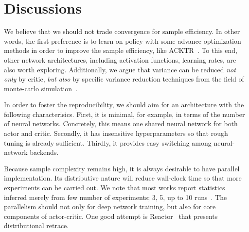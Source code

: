 \section{Discussions}






We believe that we should not trade convergence for sample efficiency.
In other words, the first preference is to learn on-policy with some advance optimization methods
in order to improve the sample efficiency, like ACKTR~\cite{NIPS2017_7112}.
To this end, other network architectures, including activation functions, learning rates, are also worth exploring.
Additionally, we argue that variance can be reduced \emph{not only} by critic,
\emph{but also} by specific variance reduction techniques from the field of monte-carlo simulation~\cite{citeulike:14544227}.

In order to foster the reproducibility, we should aim for an architecture with the following characterisics.
First, it is minimal, for example, in terms of the number of neural networks.
Concretely, this means one shared neural network for both actor and critic.
Secondly, it has insensitive hyperparameters so that rough tuning is already sufficient.
Thirdly, it provides easy switching among neural-network backends.

Because sample complexity remains high, it is always desirable to have parallel implementation.
Its distributive nature will reduce wall-clock time so that more experiments can be carried out.
We note that most works report statistics inferred merely from few number of experiments; 3, 5, up to 10 runs~\cite{henderson2017reinforcement}.
The parallelism should not only for deep network training, but also for core components of actor-critic.
One good attempt is Reactor~\cite{Gruslys2018} that presents distributional retrace.
